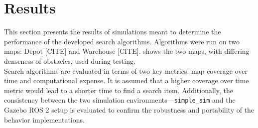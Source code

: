 
\section{Results}
\label{sec:results}
This section presents the results of simulations meant to determine the performance of the developed search algorithms. Algorithms were run on two maps: Depot {\color{red} [CITE]} and Warehouse {\color{red} [CITE]}.  shows the two maps, with differing denseness of obstacles, used during testing. \\

Search algorithms are evaluated in terms of two key metrics: map coverage over time and computational expense. It is assumed that a higher coverage over time metric would lead to a shorter time to find a search item. Additionally, the consistency between the two simulation environments—\texttt{simple\_sim} and the Gazebo ROS 2 setup is evaluated to confirm the robustness and portability of the behavior implementations.

